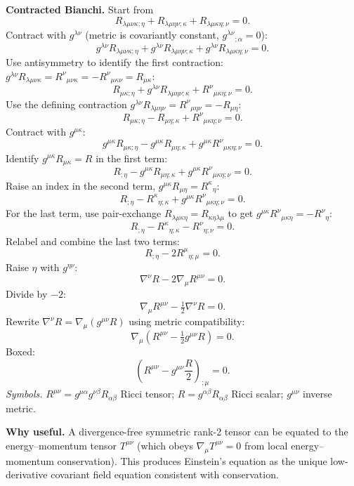 \documentclass[11pt]{article}
\begin{document}
\textbf{Contracted Bianchi.} Start from
\begin{equation}
R_{\lambda\mu\nu\kappa;\eta}+R_{\lambda\mu\eta\nu;\kappa}+R_{\lambda\mu\kappa\eta;\nu}=0.
\label{eq:bianchi}
\end{equation}
Contract with $g^{\lambda\nu}$ (metric is covariantly constant, $g^{\lambda\nu}{}_{;\alpha}=0$):
\[ g^{\lambda\nu}R_{\lambda\mu\nu\kappa;\eta}+g^{\lambda\nu}R_{\lambda\mu\eta\nu;\kappa}+g^{\lambda\nu}R_{\lambda\mu\kappa\eta;\nu}=0. \]
Use antisymmetry to identify the first contraction: $g^{\lambda\nu}R_{\lambda\mu\nu\kappa}=R^{\nu}{}_{\mu\nu\kappa}=-R^{\nu}{}_{\mu\kappa\nu}=R_{\mu\kappa}$:
\[ R_{\mu\kappa;\eta}+g^{\lambda\nu}R_{\lambda\mu\eta\nu;\kappa}+R^{\nu}{}_{\mu\kappa\eta;\nu}=0. \]
Use the defining contraction $g^{\lambda\nu}R_{\lambda\mu\eta\nu}=R^{\nu}{}_{\mu\eta\nu}=-R_{\mu\eta}$:
\[ R_{\mu\kappa;\eta}-R_{\mu\eta;\kappa}+R^{\nu}{}_{\mu\kappa\eta;\nu}=0. \]
Contract with $g^{\mu\kappa}$:
\[ g^{\mu\kappa}R_{\mu\kappa;\eta}-g^{\mu\kappa}R_{\mu\eta;\kappa}+g^{\mu\kappa}R^{\nu}{}_{\mu\kappa\eta;\nu}=0. \]
Identify $g^{\mu\kappa}R_{\mu\kappa}=R$ in the first term:
\[ R_{;\eta}-g^{\mu\kappa}R_{\mu\eta;\kappa}+g^{\mu\kappa}R^{\nu}{}_{\mu\kappa\eta;\nu}=0. \]
Raise an index in the second term, $g^{\mu\kappa}R_{\mu\eta}=R^{\kappa}{}_{\eta}$:
\[ R_{;\eta}-R^{\kappa}{}_{\eta;\kappa}+g^{\mu\kappa}R^{\nu}{}_{\mu\kappa\eta;\nu}=0. \]
For the last term, use pair-exchange $R_{\lambda\mu\kappa\eta}=R_{\kappa\eta\lambda\mu}$ to get $g^{\mu\kappa}R^{\nu}{}_{\mu\kappa\eta}=-R^{\nu}{}_{\eta}$:
\[ R_{;\eta}-R^{\kappa}{}_{\eta;\kappa}-R^{\nu}{}_{\eta;\nu}=0. \]
Relabel and combine the last two terms:
\[ R_{;\eta}-2R^{\mu}{}_{\eta;\mu}=0. \]
Raise $\eta$ with $g^{\eta\nu}$:
\[ \nabla^\nu R-2\nabla_\mu R^{\mu\nu}=0. \]
Divide by $-2$:
\[ \nabla_\mu R^{\mu\nu}-\tfrac12\nabla^\nu R=0. \]
Rewrite $\nabla^\nu R=\nabla_\mu(g^{\mu\nu}R)$ using metric compatibility:
\[ \nabla_\mu\!\left(R^{\mu\nu}-\tfrac12 g^{\mu\nu}R\right)=0. \]
Boxed:
\begin{equation}
\boxed{\;\left(R^{\mu\nu}-g^{\mu\nu}\frac{R}{2}\right)_{\!;\mu}=0.\;}
\label{eq:einstein-div}
\end{equation}
\emph{Symbols.} $R^{\mu\nu}=g^{\mu\alpha}g^{\nu\beta}R_{\alpha\beta}$ Ricci tensor; $R=g^{\alpha\beta}R_{\alpha\beta}$ Ricci scalar; $g^{\mu\nu}$ inverse metric.

\textbf{Why useful.} A divergence-free symmetric rank-2 tensor can be equated to the energy--momentum tensor $T^{\mu\nu}$ (which obeys $\nabla_\mu T^{\mu\nu}=0$ from local energy--momentum conservation). This produces Einstein's equation as the unique low-derivative covariant field equation consistent with conservation.
\end{document}
